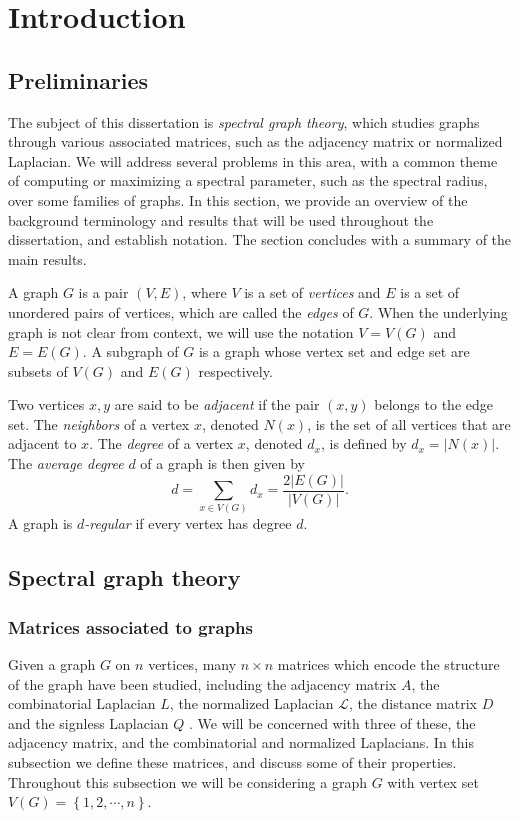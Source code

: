 \chapter{Introduction}

\section{Preliminaries}

The subject of this dissertation is \textit{spectral graph theory}, which studies graphs through
various associated matrices, such as the adjacency matrix or normalized Laplacian.
We will address several problems in this area, with a common theme
of computing or maximizing a spectral parameter, such as the spectral radius, over some families of graphs.  
In this section, we provide an overview of the background terminology and results that will be used throughout the
dissertation, and establish notation.  The section concludes with a summary of the main results.


A graph $G$ is a pair $(V,E)$, where $V$ is a set of \textit{vertices} and $E$ is a set of unordered
pairs of vertices, which are called the \textit{edges} of $G$.  When the underlying graph is not clear from context, we will
use the notation $V = V(G)$ and $E = E(G)$.  A subgraph of $G$ is a graph whose vertex set and
edge set are subsets of $V(G)$ and $E(G)$ respectively.


Two vertices $x,y$ are said to be \textit{adjacent}
if the pair $(x,y)$ belongs to the edge set.  The \textit{neighbors} of a vertex $x$, denoted $N(x)$,
is the set of all vertices that are adjacent to $x$.  The \textit{degree} of a vertex $x$, denoted $d_x$,
is defined by $d_x = |N(x)|$.  The \textit{average degree} $d$ of a graph is then given by
\[ d = \sum_{x \in V(G)} d_x = \frac{2 |E(G)|}{|V(G)|}. \]
A graph is \textit{$d$-regular} if every vertex has degree $d$.



\section{Spectral graph theory}

\subsection{Matrices associated to graphs}


Given a graph $G$ on $n$ vertices, many $n \times n$ matrices which encode the structure
of the graph have been studied, including the adjacency matrix $A$, the combinatorial Laplacian $L$,
the normalized Laplacian $\mathcal{L}$, the distance matrix $D$ \cite{GrahamPollak1971}
and the signless Laplacian $Q$ \cite{CvetkovicEtAl2007}.
We will be concerned with three of these, the adjacency matrix, and the combinatorial and normalized
Laplacians.  In this subsection we define these matrices, and discuss some of their properties.
Throughout this subsection we will be considering a graph $G$ with vertex set
$V(G) = \left\{ 1,2, \cdots, n\right\}$.



